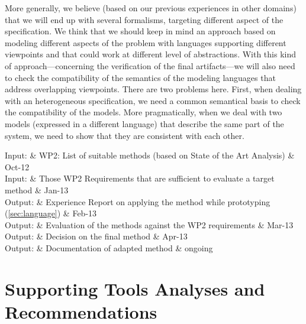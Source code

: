 \documentclass{template/openetcs_article}
\begin{document}
More generally, we believe (based on our previous experiences in other
domains) that we will end up with several formalisms, targeting
different aspect of the specification. We think that we should keep in
mind an approach based on modeling different aspects of the problem
with languages supporting different viewpoints and that could work at
different level of abstractions. With this kind of
approach---concerning the verification of the final artifacts---we
will also need to check the compatibility of the semantics of the
modeling languages that address overlapping viewpoints. There are two
problems here. First, when dealing with an heterogeneous
specification, we need a common semantical basis to check the
compatibility of the models. More pragmatically, when we deal with two
models (expressed in a different language) that describe the same part
of the system, we need to show that they are consistent with each
other.


\begin{inoutput}
Input: & WP2: List of suitable methods (based on State of the Art Analysis) & Oct-12 \\
Input: & Those WP2 Requirements that are sufficient to evaluate a target method & Jan-13 \\
\hline
Output: & Experience Report on applying the method while prototyping (\ref{sec:language}) & Feb-13 \\
Output: & Evaluation of the methods against the WP2 requirements & Mar-13 \\
Output: & Decision on the final method & Apr-13 \\
Output: & Documentation of adapted method & ongoing \\
\end{inoutput}

\section{Supporting Tools Analyses and Recommendations}
\label{sec:supporting_tools}
\end{document}
